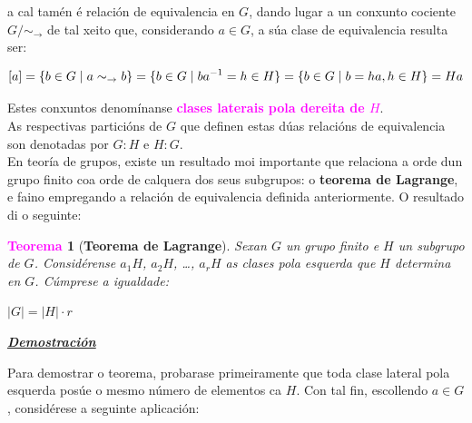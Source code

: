 \documentclass[twoside]{report}
\newcommand{\magbf}[1]{\textcolor{magenta}{\textbf{#1}}} %
\theoremstyle{mystyle}
\newtheorem{theo}{\magbf{Teorema}}[chapter]
\newenvironment{theorem}
{\begin{mdframed}[linecolor = magenta,backgroundcolor = classicrose, linewidth = 2mm]\begin{theo}}
{\end{theo}\end{mdframed}}
\begin{document}
\vspace{3mm} 

\noindent a cal tamén é relación de equivalencia en $G$, dando lugar a un conxunto cociente $G/\sim_{\rightarrow}$ de tal xeito que, considerando $a \in G$, a súa clase de equivalencia resulta ser:

$$[a] = \{ b \in G \hspace{1MM} | \hspace{1MM} a \sim_{\rightarrow} b \} = \{ b \in G \hspace{1MM} | \hspace{1MM} ba^{-1} = h \in H \} = \{ b \in G \hspace{1MM} | \hspace{1MM} b = ha, h \in H \} = Ha$$

\vspace{2mm}

\noindent Estes conxuntos denomínanse \textcolor{magenta}{\textbf{clases laterais pola dereita de $H$}}.\\

\noindent As respectivas particións de $G$ que definen estas dúas relacións de equivalencia son denotadas por $G:H$ e $H:G$. \\

\noindent En teoría de grupos, existe un resultado moi importante que relaciona a orde dun grupo finito coa orde de calquera dos seus subgrupos: o \textbf{teorema de Lagrange}, e faino empregando a relación de equivalencia definida anteriormente. O resultado di o seguinte:\\

\begin{theorem}[\textbf{Teorema de Lagrange}] \label{th1.2}
Sexan $G$ un grupo finito e $H$ un subgrupo de $G$. Considérense $a_{1}H$, $a_{2}H$, \dots, $a_{r}H$ as clases pola esquerda que $H$ determina en $G$. Cúmprese a igualdade: 
\begin{center}
    $|G| = |H| \cdot r$ 
\end{center} 
\end{theorem}

\vspace{2mm}

\noindent \textbf{\textit{\underline{Demostración}}}

\vspace{2mm}

\noindent Para demostrar o teorema, probarase primeiramente que toda clase lateral pola esquerda posúe o mesmo número de elementos ca $H$. Con tal fin, escollendo $a \in G$, considérese a seguinte aplicación:
\end{document}
